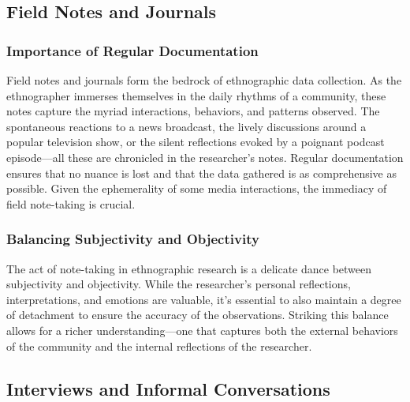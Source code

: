 \documentclass[
  b5paper]{book}
\begin{document}
\hypertarget{field-notes-and-journals}{%
\subsection*{Field Notes and Journals}\label{field-notes-and-journals}}

\hypertarget{importance-of-regular-documentation}{%
\subsubsection*{Importance of Regular Documentation}\label{importance-of-regular-documentation}}

Field notes and journals form the bedrock of ethnographic data collection. As the ethnographer immerses themselves in the daily rhythms of a community, these notes capture the myriad interactions, behaviors, and patterns observed. The spontaneous reactions to a news broadcast, the lively discussions around a popular television show, or the silent reflections evoked by a poignant podcast episode---all these are chronicled in the researcher's notes. Regular documentation ensures that no nuance is lost and that the data gathered is as comprehensive as possible. Given the ephemerality of some media interactions, the immediacy of field note-taking is crucial.

\hypertarget{balancing-subjectivity-and-objectivity}{%
\subsubsection*{Balancing Subjectivity and Objectivity}\label{balancing-subjectivity-and-objectivity}}

The act of note-taking in ethnographic research is a delicate dance between subjectivity and objectivity. While the researcher's personal reflections, interpretations, and emotions are valuable, it's essential to also maintain a degree of detachment to ensure the accuracy of the observations. Striking this balance allows for a richer understanding---one that captures both the external behaviors of the community and the internal reflections of the researcher.

\hypertarget{interviews-and-informal-conversations}{%
\subsection*{Interviews and Informal Conversations}\label{interviews-and-informal-conversations}}
\end{document}
